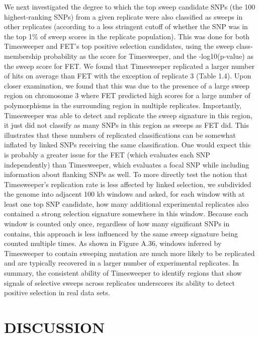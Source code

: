 We next investigated the degree to which the top sweep candidate SNPs (the 100 highest-ranking SNPs) from a given replicate were also classified as sweeps in other replicates (according to a less stringent cutoff of whether the SNP was in the top 1\% of sweep scores in the replicate population). This was done for both Timesweeper and FET’s top positive selection candidates, using the sweep class-membership probability as the score for Timesweeper, and the -log10(p-value) as the sweep score for FET. We found that Timesweeper replicated a larger number of hits on average than FET with the exception of replicate 3 (Table 1.4). Upon closer examination, we found that this was due to the presence of a large sweep region on chromosome 3 where FET predicted high scores for a large number of polymorphisms in the surrounding region in multiple replicates. Importantly, Timesweeper was able to detect and replicate the sweep signature in this region, it just did not classify as many SNPs in this region as sweeps as FET did. This illustrates that these numbers of replicated classifications can be somewhat inflated by linked SNPs receiving the same classification. One would expect this is probably a greater issue for the FET (which evaluates each SNP independently) than Timesweeper, which evaluates a focal SNP while including information about flanking SNPs as well. To more directly test the notion that Timesweeper’s replication rate is less affected by linked selection, we subdivided the genome into adjacent 100 kb windows and asked, for each window with at least one top SNP candidate, how many additional experimental replicates also contained a strong selection signature somewhere in this window. Because each window is counted only once, regardless of how many significant SNPs in contains, this approach is less influenced by the same sweep signature being counted multiple times. As shown in Figure A.36, windows inferred by Timesweeper to contain sweeping mutation are much more likely to be replicated and are typically recovered in a larger number of experimental replicates. In summary, the consistent ability of Timesweeper to identify regions that show signals of selective sweeps across replicates underscores its ability to detect positive selection in real data sets. 



\section{DISCUSSION}


